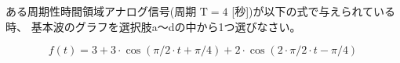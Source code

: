 ある周期性時間領域アナログ信号(周期 $\textrm{T} = 4$ [秒])が以下の式で与えられている時、
基本波のグラフを選択肢a〜dの中から1つ選びなさい。

\[
f(t) = 
3
+ 3 \cdot \cos( \pi/2 \cdot t + \pi/4)
+ 2 \cdot \cos( 2 \cdot \pi/2 \cdot t -\pi/4 )
\]
